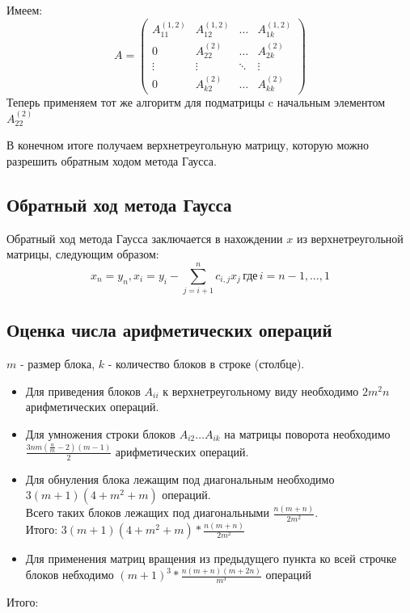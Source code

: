 \documentclass[a4paper, fontsize=14pt]{article}
\begin{document}
		Имеем:
		\begin{equation*}
			A = \left(
			\begin{array}{cccc}
				A_{11}^{(1,2)} & A_{12}^{(1,2)} & \ldots & A_{1k}^{(1,2)}\\
				0 & A_{22}^{(2)} & \ldots & A_{2k}^{(2)}\\
				\vdots & \vdots & \ddots & \vdots\\
				0 & A_{k2}^{(2)} & \ldots & A_{kk}^{(2)}
			\end{array}
			\right)
		\end{equation*}
		Теперь применяем тот же алгоритм для подматрицы c начальным элементом $A_{22}^{(2)}$
		
		В конечном итоге получаем верхнетреугольную матрицу, которую можно разрешить обратным ходом метода Гаусса.
	 	\subsection{Обратный ход метода Гаусса}
	    Обратный ход метода Гаусса заключается в нахождении $x$ из верхнетреугольной матрицы, следующим образом:
	 	$$x_n = y_n, x_i = y_i - \sum_{j = i+1}^{n} c_{i,j}x_j \,\text{где} \, i=n-1,\dots,1$$
	 	
		\subsection{Оценка числа арифметических операций}
		$m$ - размер блока, $k$ - количество блоков в строке (столбце). 
		\begin{itemize}
			\item Для приведения блоков $A_{ii}$ к верхнетреугольному виду необходимо $2m^2n$ арифметических операций.
			\item Для умножения строки блоков $A_{i2}\dots A_{ik}$ на матрицы поворота необходимо $\frac{3nm(\frac{n}{m}-2)(m-1)}{2}$ арифметических операций.
			\item Для обнуления блока лежащим под диагональным необходимо $3(m+1)(4 + m^2 +m)$ операций.
			\\Всего таких блоков лежащих под диагональными $\frac{n(m+n)}{2m^2}$.
			\\ Итого: $3(m+1)(4 + m^2 +m) * \frac{n(m+n)}{2m^2}$
			\item Для применения матриц вращения из предыдущего пункта ко всей строчке блоков небходимо $(m+1)^3 *\frac{n(m+n)(m+2n)}{m^3}$ операций
			
		\end{itemize}
		Итого:
	
\end{document}

